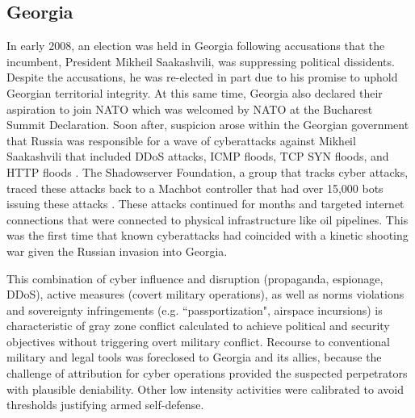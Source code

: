 \documentclass[12pt,letterpaper]{article}
\begin{document}
	\subsection{Georgia}
		In early 2008, an election was held in Georgia following accusations that the incumbent, President Mikheil Saakashvili, was suppressing political dissidents. Despite the accusations, he was re-elected in part due to his promise to uphold Georgian territorial integrity. At this same time, Georgia also declared their aspiration to join NATO which was welcomed by NATO at the Bucharest Summit Declaration. Soon after, suspicion arose within the Georgian government that Russia was responsible for a wave of cyberattacks against Mikheil Saakashvili that included DDoS attacks, ICMP floods, TCP SYN floods, and HTTP floods \citep{shakarian_2008russiancyber_2011}. The Shadowserver Foundation, a group that tracks cyber attacks, traced these attacks back to a Machbot controller that had over 15,000 bots issuing these attacks \citep{nazario_btf8indepthlook_2008}. These attacks continued for months and targeted internet connections that were connected to physical infrastructure like oil pipelines. This was the first time that known cyberattacks had coincided with a kinetic shooting war given the Russian invasion into Georgia.
		
		This combination of cyber influence and disruption (propaganda, espionage, DDoS), active measures (covert military operations), as well as norms violations and sovereignty infringements (e.g. ``passportization", airspace incursions) is characteristic of gray zone conflict calculated to achieve political and security objectives without triggering overt military conflict. Recourse to conventional military and legal tools was foreclosed to Georgia and its allies, because the challenge of attribution for cyber operations provided the suspected perpetrators with plausible deniability. Other low intensity activities were calibrated to avoid thresholds justifying armed self-defense.
		
\end{document}
